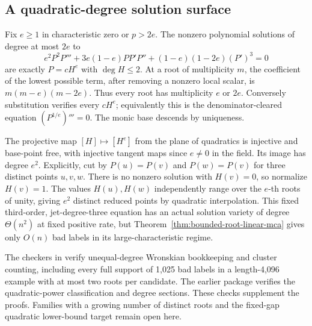\subsection{A quadratic-degree solution surface}

Fix $e\ge1$ in characteristic zero or $p>2e$. The nonzero polynomial
solutions of degree at most $2e$ to
\begin{equation}\label{eq:quadratic-power-ode}
 e^2P^2P'''+3e(1-e)PP'P''+(1-e)(1-2e)(P')^3=0
\end{equation}
are exactly $P=cH^e$ with $\deg H\le2$. At a root of multiplicity
$m$, the coefficient of the lowest possible term, after removing a
nonzero local scalar, is $m(m-e)(m-2e)$. Thus every root has
multiplicity $e$ or $2e$. Conversely substitution verifies every
$cH^e$; equivalently this is the denominator-cleared equation
$(P^{1/e})'''=0$. The monic base descends by uniqueness.

The projective map $[H]\mapsto[H^e]$ from the plane of quadratics is
injective and base-point free, with injective tangent maps since
$e\ne0$ in the field. Its image has degree $e^2$. Explicitly, cut by
$P(u)=P(v)$ and $P(w)=P(v)$ for three distinct points $u,v,w$.
There is no nonzero solution with $H(v)=0$, so normalize $H(v)=1$.
The values $H(u),H(w)$ independently range over the $e$-th roots of
unity, giving $e^2$ distinct reduced points by quadratic interpolation.
This fixed third-order, jet-degree-three equation has an actual solution
variety of degree $\Theta(n^2)$ at fixed positive rate, but
Theorem~\ref{thm:bounded-root-linear-mca} gives only $O(n)$ bad labels
in its large-characteristic regime.

The checkers in  verify unequal-degree
Wronskian bookkeeping and cluster counting, including every full support
of 1,025 bad labels in a length-4,096 example with at most two roots per
candidate. The earlier  package verifies
the quadratic-power classification and degree sections. These checks
supplement the proofs. Families with a growing number of distinct roots
and the fixed-gap quadratic lower-bound target remain open here.
